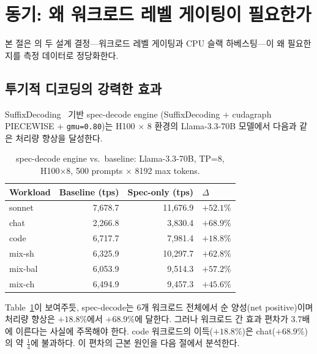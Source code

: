 
\section{동기: 왜 워크로드 레벨 게이팅이 필요한가}
\label{sec:motivation}

본 절은 \algname 의 두 설계 결정---워크로드 레벨 게이팅과 CPU 슬랙 하베스팅---이
왜 필요한지를 측정 데이터로 정당화한다.

\subsection{투기적 디코딩의 강력한 효과}
\label{subsec:mot-spec-power}

SuffixDecoding~\cite{snowflake-arctic} 기반 spec-decode engine
(SuffixDecoding $+$ cudagraph PIECEWISE $+$ \texttt{gmu=0.80})는
H100 $\times$ 8 환경의 Llama-3.3-70B 모델에서 다음과 같은 처리량 향상을 달성한다.



\begin{table}[t]
\centering
\caption{spec-decode engine vs.\ baseline: Llama-3.3-70B, TP=8, H100$\times$8,
  500 prompts $\times$ 8192 max tokens.}
\label{tbl:trident-vs-vanilla}
\footnotesize
\begin{tabular}{@{}lrrl@{}}
\toprule
\textbf{Workload} & \textbf{Baseline (tps)} & \textbf{Spec-only (tps)} & \textbf{$\Delta$} \\
\midrule
sonnet  & 7,678.7  & 11,676.9 & $\mathbf{+52.1\%}$ \\
chat    & 2,266.8  & 3,830.4  & $\mathbf{+68.9\%}$ \\
code    & 6,717.7  & 7,981.4  & $\mathbf{+18.8\%}$ \\
mix-sh  & 6,325.9  & 10,297.7 & $+62.8\%$ \\
mix-bal & 6,053.9  & 9,514.3  & $+57.2\%$ \\
mix-ch  & 6,494.9  & 9,457.3  & $+45.6\%$ \\
\bottomrule
\end{tabular}
\end{table}

Table~\ref{tbl:trident-vs-vanilla}이 보여주듯, spec-decode는 6개 워크로드
전체에서 순 양성(net positive)이며 처리량 향상은 $+18.8\%$에서 $+68.9\%$에 달한다.
그러나 워크로드 간 효과 편차가 3.7배에 이른다는 사실에 주목해야 한다.
code 워크로드의 이득($+18.8\%$)은 chat($+68.9\%$)의 약 $\frac{1}{4}$에 불과하다.
이 편차의 근본 원인을 다음 절에서 분석한다.

